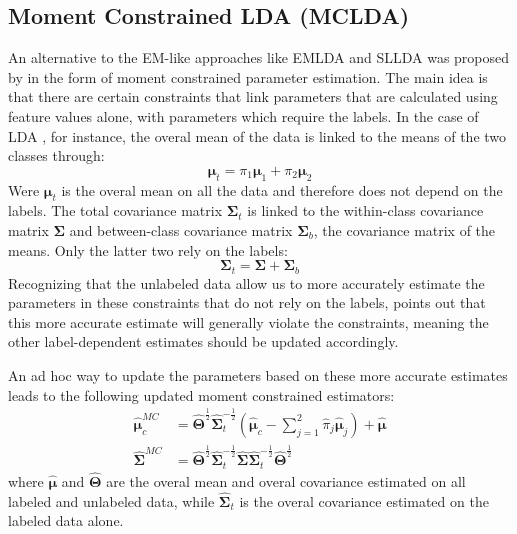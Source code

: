 \documentclass[twoside]{memoir}\usepackage[]{graphicx}\usepackage{xcolor}
\renewcommand{\cite}{\citep}
\begin{document}
\subsection{Moment Constrained LDA (MCLDA)}
An alternative to the EM-like approaches like EMLDA and SLLDA was proposed by \citet{Loog2010} in the form of moment constrained parameter estimation. The main idea is that there are certain constraints that link parameters that are calculated using feature values alone, with parameters which require the labels. In the case of LDA \cite{Loog2014a}, for instance, the overal mean of the data is linked to the means of the two classes through:
\begin{equation}
\label{eq:constraintmean}
\boldsymbol{\mu}_t=\pi_1 \boldsymbol{\mu}_1 + \pi_2 \boldsymbol{\mu}_2
\end{equation}
Were $\boldsymbol{\mu}_t$ is the overal mean on all the data and therefore does not depend on the labels.
The total covariance matrix $\mathbf{\Sigma}_t$ is linked to the within-class covariance matrix $\mathbf{\Sigma}$ and between-class covariance matrix $\mathbf{\Sigma}_b$, the covariance matrix of the means. Only the latter two rely on the labels:
\begin{equation}
\label{eq:constraintcovariance}
\mathbf{\Sigma}_t=\mathbf{\Sigma} + \mathbf{\Sigma}_b
\end{equation}
Recognizing that the unlabeled data allow us to more accurately estimate the parameters in these constraints that do not rely on the labels, \citet{Loog2014a} points out that this more accurate estimate will generally violate the constraints, meaning the other label-dependent estimates should be updated accordingly.

An ad hoc way to update the parameters based on these more accurate estimates \cite{Loog2014a} leads to the following updated moment constrained estimators:
\begin{align}
\hat{\boldsymbol{\mu}}_c^{MC} & =\hat{\mathbf{\Theta}}^{\frac{1}{2}} \hat{\mathbf{\Sigma}}_t^{-\frac{1}{2}} (\hat{\boldsymbol{\mu}}_c - \sum_{j=1}^{2} \hat{\pi}_j \hat{\boldsymbol{\mu}}_j ) + \hat{\boldsymbol{\mu}} \\
\hat{\mathbf{\Sigma}}^{MC} &= \hat{\mathbf{\Theta}}^{\frac{1}{2}} \hat{\mathbf{\Sigma}}_t^{-\frac{1}{2}} \hat{\mathbf{\Sigma}} \hat{\mathbf{\Sigma}}_t^{-\frac{1}{2}} \hat{\mathbf{\Theta}}^{\frac{1}{2}}
\end{align}
where $\hat{\boldsymbol{\mu}}$ and $\hat{\mathbf{\Theta}}$ are the overal mean and overal covariance estimated on all labeled and unlabeled data, while $\hat{\mathbf{\Sigma}}_t$ is the overal covariance estimated on the labeled data alone.
\end{document}
